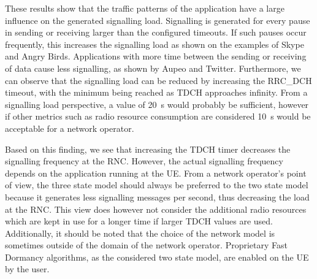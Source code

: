 These results show that the traffic patterns of the application have a large influence on the generated signalling load.
Signalling is generated for every pause in sending or receiving larger than the configured timeouts.
If such pauses occur frequently, this increases the signalling load as shown on the examples of Skype and Angry Birds.
Applications with more time between the sending or receiving of data cause less signalling, as shown by Aupeo and Twitter.
Furthermore, we can observe that the signalling load can be reduced by increasing the \gls{RRC_DCH} timeout, with the minimum being reached as \gls{TDCH} approaches infinity.
From a signalling load perspective, a value of \SI{20}{\second} would probably be sufficient, however if other metrics such as radio resource consumption are considered \SI{10}{\second} would be acceptable for a network operator.

Based on this finding, we see that increasing the \gls{TDCH} timer decreases the signalling frequency at the \gls{RNC}.
However, the actual signalling frequency depends on the application running at the \gls{UE}.
From a network operator's point of view, the three state model should always be preferred to the two state model because it generates less signalling messages per second, thus decreasing the load at the \gls{RNC}.
This view does however not consider the additional radio resources which are kept in use for a longer time if larger \gls{TDCH} values are used.
Additionally, it should be noted that the choice of the network model is sometimes outside of the domain of the network operator.
Proprietary Fast Dormancy algorithms, as the considered two state model, are enabled on the \gls{UE} by the user.

